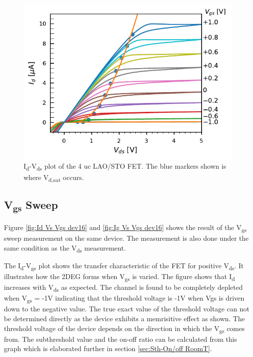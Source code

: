 \documentclass[11pt,a4paper]{report}
\begin{document}
\begin{figure}[!h]
    \centering
    \includegraphics[scale=1]{Figures/Batch2/Dev16_batch2_Vds_sweep-Ids_With_Vdsat.pdf}
    \caption{I\textsubscript{d}-V\textsubscript{ds} plot of the 4 uc LAO/STO FET. The blue markers shown is where V\textsubscript{d,sat} occurs.}
    \label{fig:Id Vs Vds dev16}
\end{figure}


\newpage
\subsection{V\textsubscript{gs} Sweep}
Figure \ref{fig:Id Vs Vgs dev16} and \ref{fig:Ig Vs Vgs dev16} shows the result of the V\textsubscript{gs} sweep measurement on the same device. The measurement is also done under the same condition as the V\textsubscript{ds} measurement. 

The I\textsubscript{d}-V\textsubscript{gs} plot shows the transfer characteristic of the FET for positive V\textsubscript{ds}. It illustrates how the 2DEG forms when V\textsubscript{gs} is varied. The figure shows that I\textsubscript{d} increases with V\textsubscript{ds} as expected. The channel is found to be completely depleted when V\textsubscript{gs} = -1V indicating that the threshold voltage is -1V when Vgs is driven down to the negative value. The true exact value of the threshold voltage can not be determined directly as the device exhibits a memrisitive effect as shown. The threshold voltage of the device depends on the direction in which the V\textsubscript{gs} comes from. The subthreshold value and the on-off ratio can be calculated from this graph which is elaborated further in section \ref{sec:Sth-On/off RoomT}. 
\end{document}

